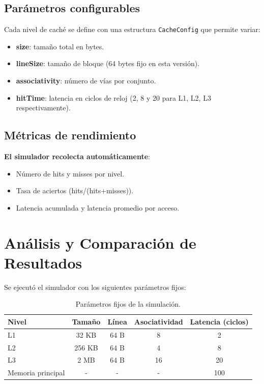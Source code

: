 \documentclass[12pt, letterpaper]{article}
\begin{document}
\subsection{Parámetros configurables}

Cada nivel de caché se define con una estructura \texttt{CacheConfig} que permite variar:
\begin{itemize}
    \item \textbf{size}: tamaño total en bytes.
    \item \textbf{lineSize}: tamaño de bloque (64 bytes fijo en esta versión).
    \item \textbf{associativity}: número de vías por conjunto.
    \item \textbf{hitTime}: latencia en ciclos de reloj (2, 8 y 20 para L1, L2, L3 respectivamente).
\end{itemize}

\subsection{Métricas de rendimiento}

\textbf{El simulador recolecta automáticamente}:
\begin{itemize}
    \item Número de hits y misses por nivel.
    \item Tasa de aciertos (hits/(hits+misses)).
    \item Latencia acumulada y latencia promedio por acceso.
\end{itemize}

\section{Análisis y Comparación de Resultados}

Se ejecutó el simulador con los siguientes parámetros fijos:

\begin{table}[h]
\centering
\begin{tabular}{|l|c|c|c|c|}
\hline
\textbf{Nivel} & \textbf{Tamaño} & \textbf{Línea} & \textbf{Asociatividad} & \textbf{Latencia (ciclos)} \\
\hline
L1 & 32 KB & 64 B & 8 & 2 \\
\hline
L2 & 256 KB & 64 B & 4 & 8 \\
\hline
L3 & 2 MB & 64 B & 16 & 20 \\
\hline
Memoria principal & - & - & - & 100 \\
\hline
\end{tabular}
\caption{Parámetros fijos de la simulación.}
\end{table}
\end{document}
